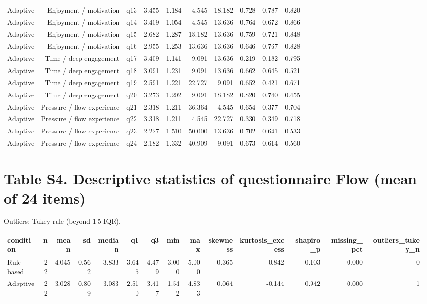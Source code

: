 \documentclass[10pt]{article}
\begin{document}
{\begin{longtable}{lrrrrrrrrr}
Adaptive & Enjoyment / motivation & q13 & 3.455 & 1.184 & 4.545 & 18.182 & 0.728 & 0.787 & 0.820 \\
Adaptive & Enjoyment / motivation & q14 & 3.409 & 1.054 & 4.545 & 13.636 & 0.764 & 0.672 & 0.866 \\
Adaptive & Enjoyment / motivation & q15 & 2.682 & 1.287 & 18.182 & 13.636 & 0.759 & 0.721 & 0.848 \\
Adaptive & Enjoyment / motivation & q16 & 2.955 & 1.253 & 13.636 & 13.636 & 0.646 & 0.767 & 0.828 \\
Adaptive & Time / deep engagement & q17 & 3.409 & 1.141 & 9.091 & 13.636 & 0.219 & 0.182 & 0.795 \\
Adaptive & Time / deep engagement & q18 & 3.091 & 1.231 & 9.091 & 13.636 & 0.662 & 0.645 & 0.521 \\
Adaptive & Time / deep engagement & q19 & 2.591 & 1.221 & 22.727 & 9.091 & 0.652 & 0.421 & 0.671 \\
Adaptive & Time / deep engagement & q20 & 3.273 & 1.202 & 9.091 & 18.182 & 0.820 & 0.740 & 0.455 \\
Adaptive & Pressure / flow experience & q21 & 2.318 & 1.211 & 36.364 & 4.545 & 0.654 & 0.377 & 0.704 \\
Adaptive & Pressure / flow experience & q22 & 3.318 & 1.211 & 4.545 & 22.727 & 0.330 & 0.349 & 0.718 \\
Adaptive & Pressure / flow experience & q23 & 2.227 & 1.510 & 50.000 & 13.636 & 0.702 & 0.641 & 0.533 \\
Adaptive & Pressure / flow experience & q24 & 2.182 & 1.332 & 40.909 & 9.091 & 0.673 & 0.614 & 0.560 \\
\bottomrule
\end{longtable}}

\section*{Table S4. Descriptive statistics of questionnaire Flow (mean of 24 items)}
Outliers: Tukey rule (beyond 1.5 IQR).

{\scriptsize\setlength{\tabcolsep}{3pt}\begin{longtable}{lrrrrrrrrrrrrr}
\toprule
condition & n & mean & sd & median & q1 & q3 & min & max & skewness & kurtosis\_excess & shapiro\_p & missing\_pct & outliers\_tukey\_n \\
\midrule
\endhead
Rule-based & 22 & 4.045 & 0.562 & 3.833 & 3.646 & 4.479 & 3.000 & 5.000 & 0.365 & -0.842 & 0.103 & 0.000 & 0 \\
Adaptive & 22 & 3.028 & 0.809 & 3.083 & 2.510 & 3.417 & 1.542 & 4.833 & 0.064 & -0.144 & 0.942 & 0.000 & 1 \\
\bottomrule
\end{longtable}}
\end{document}
